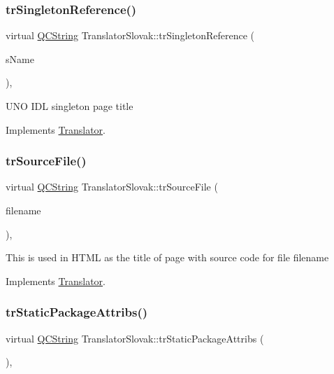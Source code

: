 \subsubsection{\texorpdfstring{trSingletonReference()}{trSingletonReference()}}
{\footnotesize\ttfamily virtual \mbox{\hyperlink{class_q_c_string}{Q\+C\+String}} Translator\+Slovak\+::tr\+Singleton\+Reference (\begin{DoxyParamCaption}\item[{const char $\ast$}]{s\+Name }\end{DoxyParamCaption})\hspace{0.3cm}{\ttfamily [inline]}, {\ttfamily [virtual]}}

U\+NO I\+DL singleton page title 

Implements \mbox{\hyperlink{class_translator}{Translator}}.

\mbox{\label{class_translator_slovak_a52f837fbf657afb42fad6dbd8ed79763}} 
\subsubsection{\texorpdfstring{trSourceFile()}{trSourceFile()}}
{\footnotesize\ttfamily virtual \mbox{\hyperlink{class_q_c_string}{Q\+C\+String}} Translator\+Slovak\+::tr\+Source\+File (\begin{DoxyParamCaption}\item[{\mbox{\hyperlink{class_q_c_string}{Q\+C\+String}} \&}]{filename }\end{DoxyParamCaption})\hspace{0.3cm}{\ttfamily [inline]}, {\ttfamily [virtual]}}

This is used in H\+T\+ML as the title of page with source code for file filename 

Implements \mbox{\hyperlink{class_translator}{Translator}}.

\mbox{\label{class_translator_slovak_afd4a05cc583ac0ff34451be0e547ced7}} 
\subsubsection{\texorpdfstring{trStaticPackageAttribs()}{trStaticPackageAttribs()}}
{\footnotesize\ttfamily virtual \mbox{\hyperlink{class_q_c_string}{Q\+C\+String}} Translator\+Slovak\+::tr\+Static\+Package\+Attribs (\begin{DoxyParamCaption}{ }\end{DoxyParamCaption})\hspace{0.3cm}{\ttfamily [inline]}, {\ttfamily [virtual]}}

